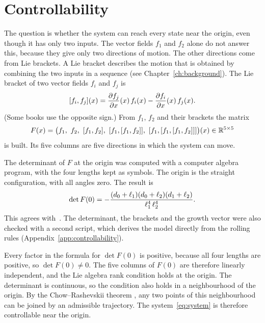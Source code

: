 \section{Controllability}
\label{sec:controllability}

The question is whether the system can reach every state near the origin, even
though it has only two inputs. The vector fields $f_1$ and $f_2$ alone do not
answer this, because they give only two directions of motion. The other
directions come from Lie brackets. A Lie bracket describes the motion that is
obtained by combining the two inputs in a sequence (see
Chapter~\ref{ch:background}). The Lie bracket of two vector fields $f_i$ and $f_j$ is
\begin{equation}
  [f_i,f_j](x)=\frac{\partial f_j}{\partial x}(x)\,f_i(x)
                      -\frac{\partial f_i}{\partial x}(x)\,f_j(x).
  \label{eq:bracket}
\end{equation}
(Some books use the opposite sign.) From $f_1$, $f_2$ and their brackets the
matrix
\begin{equation}
  F(x)=\bigl(f_1,\ f_2,\ [f_1,f_2],\
     [f_1,[f_1,f_2]],\
     [f_1,[f_1,[f_1,f_2]]]\bigr)(x)\in\mathbb{R}^{5\times5}
  \label{eq:Fmatrix}
\end{equation}
is built. Its five columns are five directions in which the system can move.

The determinant of $F$ at the origin was computed with a computer algebra
program, with the four lengths kept as symbols. The origin is the straight
configuration, with all angles zero. The result is
\begin{equation}
  \det F(0)=-\frac{(d_0+\ell_1)(d_0+\ell_2)(d_1+\ell_2)}
                  {\ell_1^{4}\,\ell_2^{4}} .
  \label{eq:detF}
\end{equation}
This agrees with~\cite{zuyev2024}. The determinant, the brackets and the growth
vector were also checked with a second script, which derives the model directly
from the rolling rules (Appendix~\ref{app:controllability}).

Every factor in the formula for $\det F(0)$ is positive, because all four
lengths are positive, so $\det F(0)\neq0$. The five columns of $F(0)$ are
therefore linearly independent, and the Lie algebra rank condition holds at the
origin. The determinant is continuous, so the condition also holds in a
neighbourhood of the origin. By the Chow--Rashevskii theorem
\cite{nijmeijer1990}, any two points of this neighbourhood can be joined by an
admissible trajectory. The system~\eqref{eq:system} is therefore controllable
near the origin.


